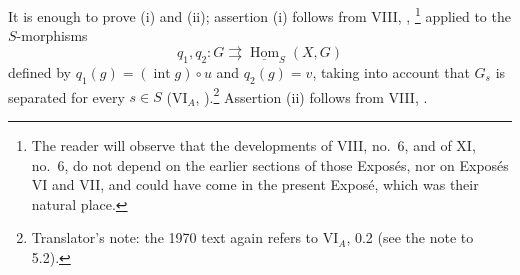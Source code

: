 It is enough to prove \textup{(i)} and \textup{(ii)}; assertion \textup{(i)} follows from
VIII, ,%
\begingroup
\renewcommand{\thefootnote}{\ensuremath{(\ast)}}%
\footnote[1]{\label{note:sga3-VIB-6.2-star}The reader will observe that the developments of VIII, no.~6,
and of XI, no.~6, do not depend on the earlier sections of those Expos\'es, nor on Expos\'es VI and VII, and could
have come in the present Expos\'e, which was their natural place.}%
\endgroup{}
applied to the \(S\)-morphisms
\[
  q_1,q_2:G\rightrightarrows\underline{\operatorname{Hom}}_S(X,G)
\]
defined by \(q_1(g)=(\operatorname{int}g)\circ u\) and \(q_2(g)=v\), taking into account that \(G_s\) is
separated for every \(s\in S\) (VI\(_A\), ).\footnote{Translator's note:
the 1970 text again refers to VI\(_A\), 0.2 (see the note to 5.2).} Assertion \textup{(ii)} follows from
VIII, .


